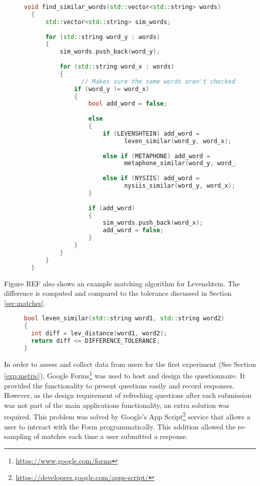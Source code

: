 \begin{figure}[h!]
\begin{lstlisting}[language=C++, frame=single]
  void find_similar_words(std::vector<std::string> words)
  {
      std::vector<std::string> sim_words;
  
      for (std::string word_y : words)
      {
          sim_words.push_back(word_y);
  
          for (std::string word_x : words)
          {
                // Makes sure the same words aren't checked
              if (word_y != word_x)
              {
                  bool add_word = false;
  
                  else
                  {
                      if (LEVENSHTEIN) add_word = 
                            leven_similar(word_y, word_x);
  
                      else if (METAPHONE) add_word = 
                            metaphone_similar(word_y, word_x);
  
                      else if (NYSIIS) add_word = 
                            nysiis_similar(word_y, word_x);
                  }
                  
                  if (add_word)
                  {
                      sim_words.push_back(word_x);
                      add_word = false;
                  }
              }
          }
      }
  }
  \end{lstlisting}
  \caption{}
\end{figure}

\newpage

Figure REF also shows an example matching algorithm for Levenshtein. The difference is computed and compared to the tolerance discussed in Section \ref{sec:matches}.

\begin{figure}[h!]
\begin{lstlisting}[language=C++, frame=single]
bool leven_similar(std::string word1, std::string word2)
{
  int diff = lev_distance(word1, word2);
  return diff <= DIFFERENCE_TOLERANCE;
}
\end{lstlisting}
\caption{}
\end{figure}


In order to assess and collect data from users for the first experiment (See Section \ref{exp:metric}), Google Forms\footnote{\url{https://www.google.com/forms}} was used to host and design the questionnaire. It provided the functionality to present questions easily and record responses. However, as the design requirement of refreshing questions after each submission was not part of the main applications functionality, an extra solution was required. This problem was solved by Google's App Script\footnote{\url{https://developers.google.com/apps-script/}} service that allows a user to interact with the Form programmatically. This addition allowed the re-sampling of matches  each time a user submitted a response. 

